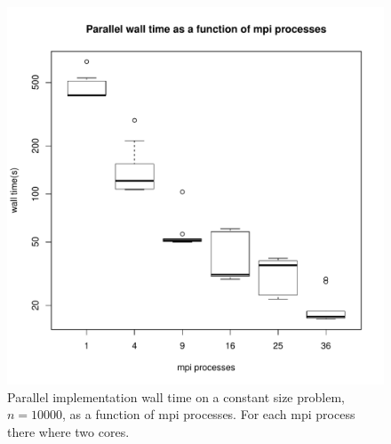 \documentclass{article}
\begin{document}
\begin{figure}[H]
  \begin{center}
    \includegraphics[width=12cm]{../analysis/mpi_nodes_walltime.pdf}
  \end{center}
  \caption{Parallel implementation wall time on a constant size problem, $n=10000$, as a function of mpi processes. For each mpi process there where two cores.}
  \label{parallel_walltime2}
\end{figure}
\end{document}
